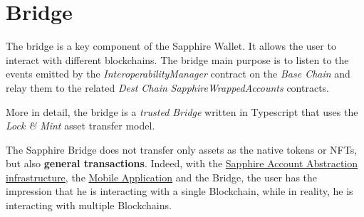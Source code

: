 \section{Bridge}
\label{sec:bridge}

The bridge is a key component of the Sapphire Wallet. It allows the user to interact with different blockchains. The bridge main purpose is to listen to the events emitted by the \textit{InteroperabilityManager} contract on the \textit{Base Chain} and relay them to the related \textit{Dest Chain} \textit{SapphireWrappedAccounts} contracts. 

More in detail, the bridge is a \textit{trusted Bridge} written in Typescript that uses the \textit{Lock \& Mint} asset transfer model. 

The Sapphire Bridge does not transfer only assets as the native tokens or NFTs, but also \textbf{general transactions}. Indeed, with the \hyperref[sec:blockchain]{Sapphire Account Abstraction infrastructure}, the \hyperref[sec:mobile_application]{Mobile Application} and the Bridge, the user has the impression that he is interacting with a single Blockchain, while in reality, he is interacting with multiple Blockchains. 